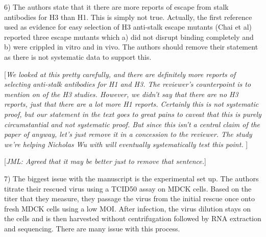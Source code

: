\documentclass[11pt, oneside]{article}   	%
\newcommand{\comment}[1]{{\color{red}[\textsl{#1}]}}
\begin{document}
6) The authors state that it there are more reports of escape from stalk antibodies for H3 than H1. This is simply not true. Actually, the first reference used as evidence for easy selection of H3 anti-stalk escape mutants (Chai et al) reported three escape mutants which a) did not disrupt binding completely and b) were crippled in vitro and in vivo. The authors should remove their statement as there is not systematic data to support this. 

\comment{We looked at this pretty carefully, and there are definitely more reports of selecting anti-stalk antibodies for H1 and H3.
The reviewer's counterpoint is to mention on of the H3 studies. 
However, we didn't say that there are no H3 reports, just that there are a lot more H1 reports.
Certainly this is not systematic proof, but our statement in the text goes to great pains to caveat that this is purely circumstantial and not systematic proof.
But since this isn't a central claim of the paper of anyway, let's just remove it in a concession to the reviewer.
The study we're helping Nicholas Wu with will eventually systematically test this point.
}

\comment{JML: Agreed that it may be better just to remove that sentence.}

7) The biggest issue with the manuscript is the experimental set up. The authors titrate their rescued virus using a TCID50 assay on MDCK cells. Based on the titer that they measure, they passage the virus from the initial rescue once onto fresh MDCK cells using a low MOI. After infection, the virus dilution stays on the cells and is then harvested without centrifugation followed by RNA extraction and sequencing. There are many issue with this process. 
\end{document}
